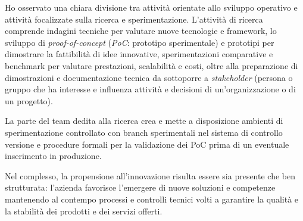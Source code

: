Ho osservato una chiara divisione tra attività orientate allo sviluppo operativo e attività focalizzate sulla ricerca e sperimentazione. 
L'attività di ricerca comprende indagini tecniche per valutare nuove tecnologie e framework, lo sviluppo di \emph{proof-of-concept} (\emph{PoC}: prototipo sperimentale) e 
prototipi per dimostrare la fattibilità di idee innovative, sperimentazioni comparative e benchmark per valutare prestazioni, scalabilità e costi, oltre alla preparazione di dimostrazioni e 
documentazione tecnica da sottoporre a \emph{stakeholder} (persona o gruppo che ha interesse e influenza attività e decisioni di un'organizzazione o di un progetto).

La parte del team dedita alla ricerca crea e mette a disposizione ambienti di sperimentazione controllato con 
branch sperimentali nel sistema di controllo versione e procedure formali per la validazione dei PoC prima di un eventuale inserimento in produzione. 

Nel complesso, la propensione all'innovazione risulta essere sia presente che ben strutturata: l'azienda favorisce l'emergere di nuove soluzioni e competenze mantenendo al contempo processi e controlli tecnici volti a 
garantire la qualità e la stabilità dei prodotti e dei servizi offerti.